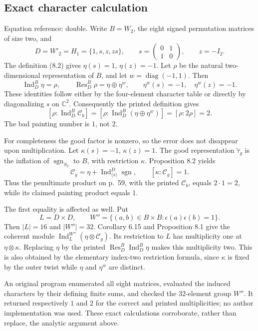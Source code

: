 \documentclass[10pt]{article}
\begin{document}
\subsection*{Exact character calculation}
Equation reference: double. Write \(B=W_2\), the eight signed permutation matrices of size two, and \[D=W'_2=H_1=\{1,s,z,zs\},\qquad
 s=\begin{pmatrix}0&1\\1&0\end{pmatrix},\qquad z=-I_2.\] The definition (8.2) gives \(\eta(s)=1\), \(\eta(z)=-1\). Let \(\rho\) be the natural two-dimensional representation of \(B\), and let \(w=\operatorname{diag}(-1,1)\). Then \[\operatorname{Ind}_D^B\eta=\rho,\qquad
 \operatorname{Res}_D^B\rho=\eta\oplus\eta^w,
 \qquad \eta^w(s)=-1,\quad\eta^w(z)=-1.\] These identities follow either by the four-element character table or directly by diagonalizing \(s\) on \(\mathbb C^2\). Consequently the printed definition gives \[
 \left[\rho:\operatorname{Ind}_D^B\mathcal C_b\right]
 =\left[\rho:\operatorname{Ind}_D^B(\eta\oplus\eta^w)\right]
 =[\rho:2\rho]=2.\] The bad painting number is \(1\), not \(2\).\par
For completeness the good factor is nonzero, so the error does not disappear upon multiplication. Let \(\kappa(s)=-1\), \(\kappa(z)=1\). The good representation \(\widetilde\tau_g\) is the inflation of \(\operatorname{sgn}_{S_2}\) to \(B\), with restriction \(\kappa\). Proposition 8.2 yields \[\mathcal C_g=\eta+\operatorname{Ind}_{\langle s\rangle}^{D}\operatorname{sgn},\qquad
 [\kappa:\mathcal C_g]=1.\] Thus the penultimate product on p. 59, with the printed \(\mathcal C_b\), equals \(2\cdot1=2\), while its claimed painting product equals \(1\).\par
The first equality is affected as well. Put \[L=D\times D,\qquad
 W''=\{(a,b)\in B\times B:\epsilon(a)\epsilon(b)=1\}.\] Then \(|L|=16\) and \(|W''|=32\). Corollary 6.15 and Proposition 8.1 give the coherent module \(\operatorname{Ind}_L^{W''}(\eta\otimes\mathcal C_g)\). Its restriction to \(L\) has multiplicity one at \(\eta\otimes\kappa\). Replacing \(\eta\) by the printed \(\operatorname{Res}_D^B\operatorname{Ind}_D^B\eta\) makes this multiplicity two. This is also obtained by the elementary index-two restriction formula, since \(\kappa\) is fixed by the outer twist while \(\eta\) and \(\eta^w\) are distinct.\par
An original program enumerated all eight matrices, evaluated the induced characters by their defining finite sums, and checked the \(32\)-element group \(W''\). It returned respectively \(1\) and \(2\) for the correct and printed multiplicities; no author implementation was used. These exact calculations corroborate, rather than replace, the analytic argument above.\par
\end{document}

